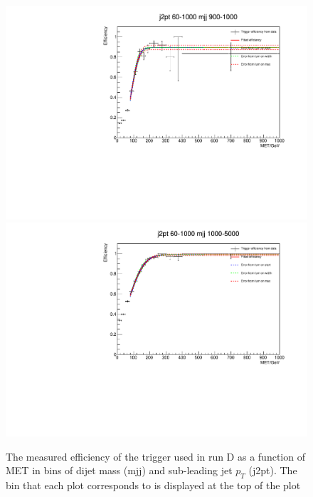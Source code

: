\begin{figure}
\begin{center}
    \includegraphics[width=.6\largefigwidth]{plots/parked/trigfitplots/hData_MET_1D_44D.pdf}
    \includegraphics[width=.6\largefigwidth]{plots/parked/trigfitplots/hData_MET_1D_45D.pdf}
    \caption{The measured efficiency of the trigger used in run D as a function of MET in bins of dijet mass (mjj) and sub-leading jet $p_{T}$ (j2pt). The bin that each plot corresponds to is displayed at the top of the plot}
    \label{fig:trigfitplotsD2}
  \end{center}
\end{figure}
